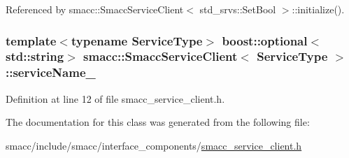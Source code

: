 Referenced by smacc\+::\+Smacc\+Service\+Client$<$ std\+\_\+srvs\+::\+Set\+Bool $>$\+::initialize().

\subsubsection[{\texorpdfstring{service\+Name\+\_\+}{serviceName_}}]{\setlength{\rightskip}{0pt plus 5cm}template$<$typename Service\+Type$>$ boost\+::optional$<$std\+::string$>$ {\bf smacc\+::\+Smacc\+Service\+Client}$<$ Service\+Type $>$\+::service\+Name\+\_\+}\hypertarget{classsmacc_1_1SmaccServiceClient_a93cf1653e9d7a0f4aa25dbb8ae7d07fc}{}\label{classsmacc_1_1SmaccServiceClient_a93cf1653e9d7a0f4aa25dbb8ae7d07fc}


Definition at line 12 of file smacc\+\_\+service\+\_\+client.\+h.



The documentation for this class was generated from the following file\+:\begin{DoxyCompactItemize}
\item 
smacc/include/smacc/interface\+\_\+components/\hyperlink{smacc__service__client_8h}{smacc\+\_\+service\+\_\+client.\+h}\end{DoxyCompactItemize}

